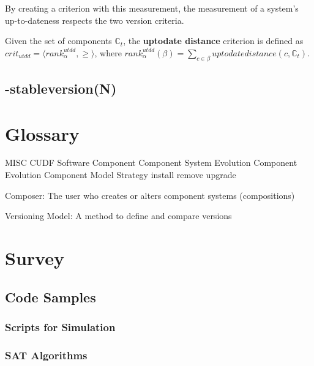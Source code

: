 By creating a criterion with this measurement, the measurement of a system's up-to-dateness respects the two version criteria.
\begin{defs}
	Given the set of components $\mathbb{C}_t$, the \textbf{uptodate distance} criterion is defined as $crit_{utdd} = \langle rank^{utdd}_{\alpha}, \geq \rangle$,
	where $rank^{utdd}_{\alpha}(\beta) = \sum_{c \in \beta} uptodatedistance(c,\mathbb{C}_t)$.
\end{defs}

\section{-stableversion(N)}



\chapter{Glossary}
MISC
CUDF
Software Component
Component System Evolution
Component Evolution
Component Model
Strategy
install
remove
upgrade

Composer: The user who creates or alters component systems (compositions)

Versioning Model: A method to define and compare versions

\chapter{Survey}
\label{apx.survey}

\section{Code Samples}
\subsection{Scripts for Simulation}
\subsection{SAT Algorithms}